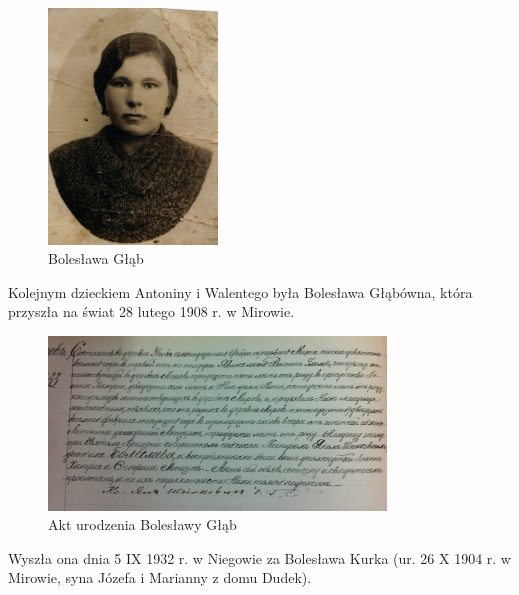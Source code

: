 \begin{figure}[!h]
\begin{center}
\includegraphics[width=0.4\textwidth]{zdjecia/boleslawa_glab.jpg}
\caption{Bolesława Głąb}
\label{rys:boleslawa_glab}
\end{center}
\end{figure}

Kolejnym dzieckiem Antoniny i Walentego była Bolesława Głąbówna, która przyszła na świat 28 lutego 1908 r. w Mirowie.

\begin{figure}[!h]
\begin{center}
\includegraphics[width=0.8\textwidth]{zdjecia/akt_urodzenia_boleslawy_glab.jpg}
\caption{Akt urodzenia Bolesławy Głąb}
\label{rys:akt_urodzenia_boleslawy_glab}
\end{center}
\end{figure}

Wyszła ona dnia 5 IX 1932 r. w Niegowie za Bolesława Kurka (ur. 26 X 1904 r. w Mirowie, syna Józefa i Marianny z domu Dudek).

